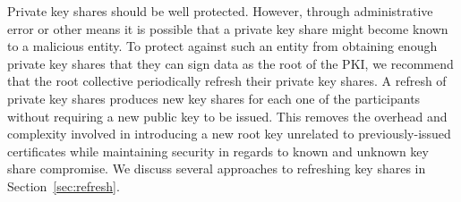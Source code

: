Private key shares should be well protected. However, through
administrative error or other means it is possible that a private
key share might become known to a malicious entity. To protect against
such an entity from obtaining enough private key shares that they can
sign data as the root of the PKI, we recommend that the root
collective periodically refresh their private key shares. A refresh of
private key shares produces new key shares for each one of the
participants without requiring a new public key to be issued. This
removes the overhead and complexity involved in introducing a new root
key unrelated to previously-issued certificates while maintaining
security in regards to known and unknown key share compromise. We
discuss several approaches to refreshing key shares in
Section~\ref{sec:refresh}.


